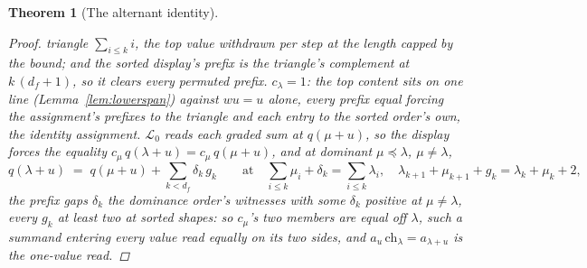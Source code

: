 \documentclass[11pt]{article}
\newtheorem{theorem}{Theorem}
\theoremstyle{definition}
\begin{document}
\begin{theorem}[The alternant identity]
\begin{proof}
triangle $\sum_{i\le k}i$, the top value withdrawn per step at the
length capped by the bound; and the sorted display's prefix is the
triangle's complement at $k\,(d_f{+}1)$, so it clears every
permuted prefix. $c_\lambda=1$: the top content sits on one line
(Lemma~\ref{lem:lowerspan}) against $wu=u$ alone, every prefix
equal forcing the assignment's prefixes to the triangle and each
entry to the sorted order's own, the identity assignment.
$\mathcal L_0$ reads each graded sum at $q(\mu{+}u)$, so the
display forces the equality
$c_\mu\,q(\lambda{+}u)=c_\mu\,q(\mu{+}u)$, and at dominant
$\mu\preceq\lambda$, $\mu\ne\lambda$,
\[
q(\lambda{+}u)\;=\;q(\mu{+}u)+\sum_{k<d_f}\delta_k\,g_k
\qquad\text{at}\quad
\sum_{i\le k}\mu_i+\delta_k=\sum_{i\le k}\lambda_i,\quad
\lambda_{k+1}{+}\mu_{k+1}{+}g_k=\lambda_k{+}\mu_k{+}2 ,
\]
the prefix gaps $\delta_k$ the dominance order's witnesses with some
$\delta_k$ positive at $\mu\ne\lambda$, every $g_k$ at least two at
sorted shapes: so $c_\mu$'s two members are equal off $\lambda$, such
a summand entering every value read equally on its two sides, and
$a_u\,\mathrm{ch}_\lambda=a_{\lambda+u}$ is the one-value read.
\end{proof}
\end{theorem}
\end{document}

